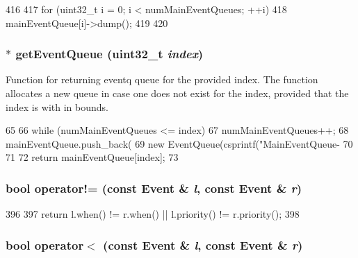 \begin{DoxyCode}
416 {
417     for (uint32_t i = 0; i < numMainEventQueues; ++i) {
418         mainEventQueue[i]->dump();
419     }
420 }
\end{DoxyCode}
\hypertarget{eventq_8hh_a5b4fbd623a1babda7d35802241f5f6cf}{
\subsubsection[{getEventQueue}]{$\ast$ getEventQueue ({\bf uint32\_\-t} {\em index})}}
\label{eventq_8hh_a5b4fbd623a1babda7d35802241f5f6cf}
Function for returning eventq queue for the provided index. The function allocates a new queue in case one does not exist for the index, provided that the index is with in bounds. 


\begin{DoxyCode}
65 {
66     while (numMainEventQueues <= index) {
67         numMainEventQueues++;
68         mainEventQueue.push_back(
69             new EventQueue(csprintf("MainEventQueue-%
70     }
71 
72     return mainEventQueue[index];
73 }
\end{DoxyCode}
\hypertarget{eventq_8hh_a88186b54fd68bd48fb160ba30c0242ee}{
\subsubsection[{operator!=}]{\setlength{\rightskip}{0pt plus 5cm}bool operator!= (const {\bf Event} \& {\em l}, \/  const {\bf Event} \& {\em r})}}
\label{eventq_8hh_a88186b54fd68bd48fb160ba30c0242ee}



\begin{DoxyCode}
396 {
397     return l.when() != r.when() || l.priority() != r.priority();
398 }
\end{DoxyCode}
\hypertarget{eventq_8hh_a3c178da5a2521e397a938853b0381cfe}{
\subsubsection[{operator$<$}]{\setlength{\rightskip}{0pt plus 5cm}bool operator$<$ (const {\bf Event} \& {\em l}, \/  const {\bf Event} \& {\em r})}}
\label{eventq_8hh_a3c178da5a2521e397a938853b0381cfe}



